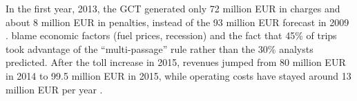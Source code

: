In the first year, 2013, the GCT generated only 72 million EUR in charges and about 8 million EUR in penalties, instead of the 93 million EUR forecast in 2009 \citep[pp. 142-143]{Borjesson2015}. \citet{Borjesson2015} blame economic factors (fuel prices, recession) and the fact that 45\% of trips took advantage of the ``multi-passage'' rule rather than the 30\% analysts predicted. After the toll increase in 2015, revenues jumped from 80 million EUR in 2014 to 99.5 million EUR in 2015, while operating costs have stayed around 13 million EUR per year \citep[table 3]{Borjesson2018}.














